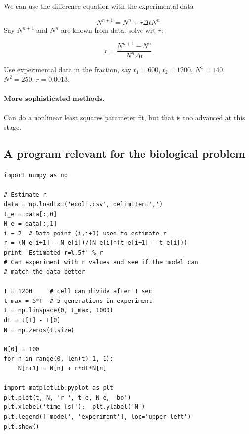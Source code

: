 \documentclass[%
twoside,                 %
final,                   %
10pt]{article}
\begin{document}
\noindent
We can use the difference equation with the experimental data

\[ N^{n+1} = N^n + r\Delta t N^n\]
Say $N^{n+1}$ and $N^n$ are known from data, solve wrt $r$:

\[ r = \frac{N^{n+1}-N^n}{N^n\Delta t} \]

Use experimental data in the fraction, say $t_1=600$, $t_2=1200$,
$N^1=140$, $N^2=250$: $r=0.0013$.




\paragraph{More sophisticated methods.}
Can do a nonlinear least squares parameter fit, but that is
too advanced at this stage.



\subsection*{A program relevant for the biological problem}



\paragraph{}
\begin{verbatim}
import numpy as np

# Estimate r
data = np.loadtxt('ecoli.csv', delimiter=',')
t_e = data[:,0]
N_e = data[:,1]
i = 2  # Data point (i,i+1) used to estimate r
r = (N_e[i+1] - N_e[i])/(N_e[i]*(t_e[i+1] - t_e[i]))
print 'Estimated r=%.5f' % r
# Can experiment with r values and see if the model can
# match the data better

T = 1200     # cell can divide after T sec
t_max = 5*T  # 5 generations in experiment
t = np.linspace(0, t_max, 1000)
dt = t[1] - t[0]
N = np.zeros(t.size)

N[0] = 100
for n in range(0, len(t)-1, 1):
    N[n+1] = N[n] + r*dt*N[n]

import matplotlib.pyplot as plt
plt.plot(t, N, 'r-', t_e, N_e, 'bo')
plt.xlabel('time [s]');  plt.ylabel('N')
plt.legend(['model', 'experiment'], loc='upper left')
plt.show()
\end{verbatim}
\end{document}

